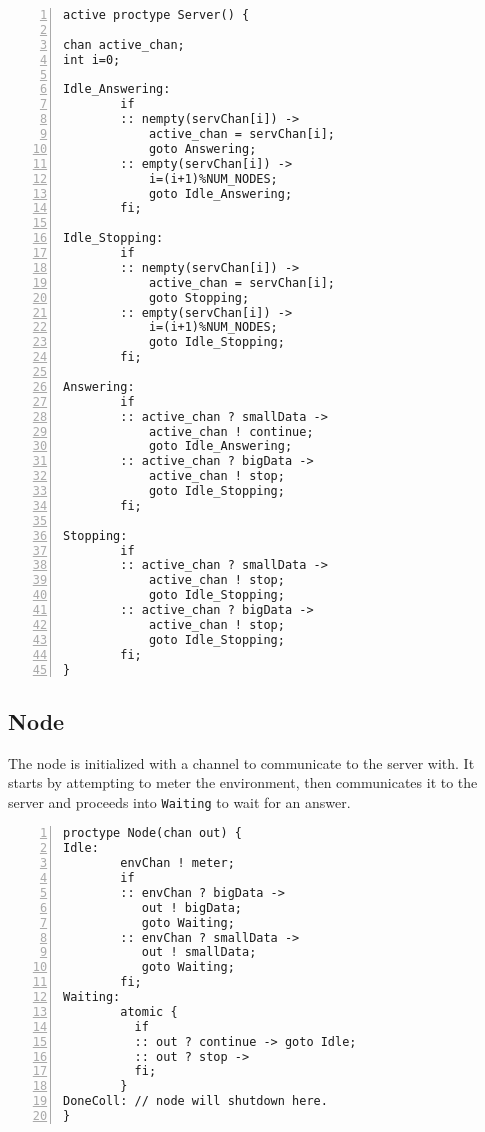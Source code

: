 \begin{lstlisting}[caption={Server code},language=Promela, numbers=left, basicstyle=\footnotesize, tabsize=2]
active proctype Server() {
   
chan active_chan;
int i=0;

Idle_Answering: 
        if
        :: nempty(servChan[i]) -> 
            active_chan = servChan[i];
            goto Answering; 
        :: empty(servChan[i]) ->
            i=(i+1)%NUM_NODES;
            goto Idle_Answering;
        fi;

Idle_Stopping:
        if
        :: nempty(servChan[i]) -> 
            active_chan = servChan[i]; 
            goto Stopping; 
        :: empty(servChan[i]) ->
            i=(i+1)%NUM_NODES;
            goto Idle_Stopping;
        fi;

Answering: 
        if
        :: active_chan ? smallData -> 
            active_chan ! continue; 
            goto Idle_Answering;
        :: active_chan ? bigData ->
            active_chan ! stop;
            goto Idle_Stopping;
        fi;

Stopping:    
        if
        :: active_chan ? smallData -> 
            active_chan ! stop; 
            goto Idle_Stopping;
        :: active_chan ? bigData ->
            active_chan ! stop;
            goto Idle_Stopping;
        fi;
}
\end{lstlisting}

\subsection{Node}

The node is initialized with a channel to communicate to the server with. It starts by attempting to meter the environment, then communicates it to the server and proceeds into \texttt{Waiting} to wait for an answer.  

\begin{lstlisting}[caption={Node code},language=Promela, numbers=left, basicstyle=\footnotesize, tabsize=2]
proctype Node(chan out) {
Idle:   
        envChan ! meter; 
        if
        :: envChan ? bigData -> 
           out ! bigData; 
           goto Waiting;
        :: envChan ? smallData -> 
           out ! smallData; 
           goto Waiting;
        fi;
Waiting:
        atomic {
          if
          :: out ? continue -> goto Idle;
          :: out ? stop -> 
          fi;
        }
DoneColl: // node will shutdown here.
}
\end{lstlisting}

